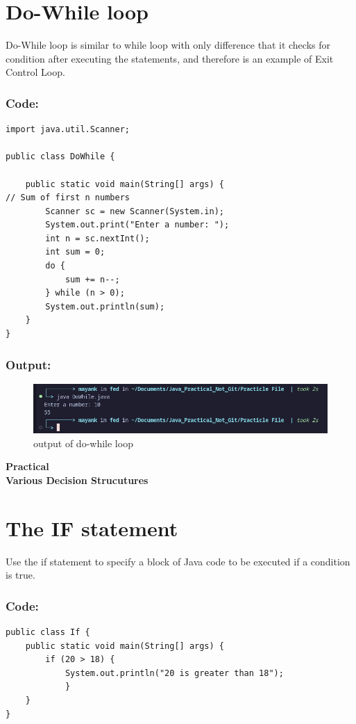 \documentclass[a4paper,12pt]{article}
\newcounter{practicalno} %
\newcommand{\practicaltitle}[1]{
    \stepcounter{practicalno} %
    \newpage
    \begin{center}
        \vspace{1cm}
        \Large\textbf{Practical \thepracticalno} \\
        \vspace{0.5cm}
        \Large\textbf{#1} %
        \normalsize\vspace{1cm}
    \end{center}
}
\begin{document}
\section{Do-While loop}
Do-While loop is similar to while loop with only difference that it checks for condition
after executing the statements, and therefore is an example of Exit Control Loop.
\subsubsection{Code: }
\begin{lstlisting}
import java.util.Scanner;

public class DoWhile {

    public static void main(String[] args) {
// Sum of first n numbers
        Scanner sc = new Scanner(System.in);
        System.out.print("Enter a number: ");
        int n = sc.nextInt();
        int sum = 0;
        do {
            sum += n--;
        } while (n > 0);
        System.out.println(sum);
    }
}
\end{lstlisting}
\subsubsection{Output: }
\begin{figure}[H]
    \centering
    \includegraphics[width=0.9\linewidth]{images/image.png}
    \caption{output of do-while loop}
    \label{fig:sample_image}
\end{figure}

\setcounter{section}{0}

\practicaltitle{Various Decision Strucutures}

\section{The IF statement}
Use the if statement to specify a block of Java code to be executed if a condition is true.
\subsubsection{Code: }
\begin{lstlisting}
public class If {
    public static void main(String[] args) {
        if (20 > 18) {
            System.out.println("20 is greater than 18");
            }
    }
}    
\end{lstlisting}
\end{document}

